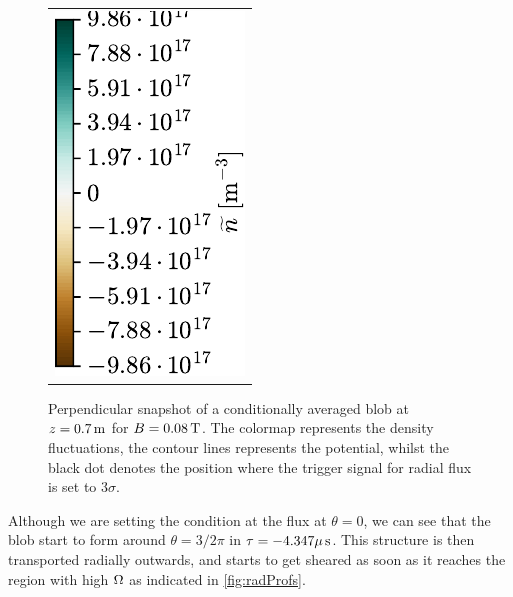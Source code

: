 \begin{figure}[h!]
\begin{tabular}{ccc}
  \multicolumn{3}{c}{\hspace*{2cm}\includegraphics[angle=-90]{fig/results/blobs/matrix-perp-blobs-B0_0.08-fluct/colorbar}}
  \\
\end{tabular}
\caption{Perpendicular snapshot of a conditionally averaged blob at $z=0.7\, \text{m}$ for $B=0.08\, \text{T}$.
    The colormap represents the density fluctuations,
    the contour lines represents the potential, whilst the black dot denotes the position where the trigger signal for radial flux is set to $3\sigma$.
}
\label{fig:perpBlob008}
\end{figure}
%
Although we are setting the condition at the flux at $\theta = 0$, we can see that the blob start to form around $\theta = 3/2 \pi$ in $\tau=-4.347\mu \, \text{s}$.
This structure is then transported radially outwards, and starts to get sheared as soon as it reaches the region with high $\Omega$ as indicated in \cref{fig:radProfs}.

